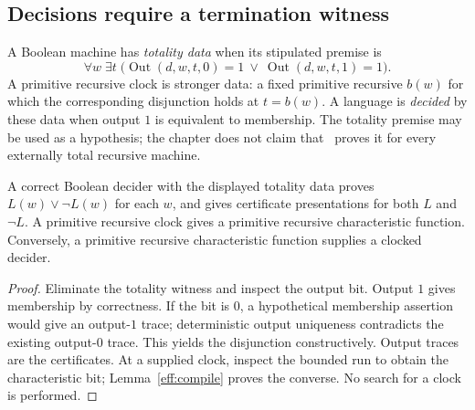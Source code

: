\subsection{Decisions require a termination witness}

\begin{definition}\label{eff:def-total}
A Boolean machine has \emph{totality data} when its stipulated premise is
\[
 \forall w\;\exists t\;\bigl(
 \operatorname{Out}(d,w,t,0)=1\ \vee\
 \operatorname{Out}(d,w,t,1)=1\bigr).
\]
A primitive recursive clock is stronger data: a fixed primitive recursive
$b(w)$ for which the corresponding disjunction holds at $t=b(w)$.
A language is \emph{decided} by these data when output $1$ is equivalent
to membership.  The totality premise may be used as a hypothesis; the
chapter does not claim that \ipra\ proves it for every externally total
recursive machine.
\end{definition}

\begin{proposition}\label{eff:total-decision}
A correct Boolean decider with the displayed totality data proves
$L(w)\vee\neg L(w)$ for each $w$, and gives certificate presentations for
both $L$ and $\neg L$.  A primitive recursive clock gives a primitive
recursive characteristic function.  Conversely, a primitive recursive
characteristic function supplies a clocked decider.
\end{proposition}
\begin{proof}
Eliminate the totality witness and inspect the output bit.  Output $1$
gives membership by correctness.  If the bit is $0$, a hypothetical
membership assertion would give an output-$1$ trace; deterministic output
uniqueness contradicts the existing output-$0$ trace.  This yields the
disjunction constructively.  Output traces are the certificates.  At a
supplied clock, inspect the bounded run to obtain the characteristic bit;
Lemma~\ref{eff:compile} proves the converse.  No search for a clock is
performed.
\end{proof}

